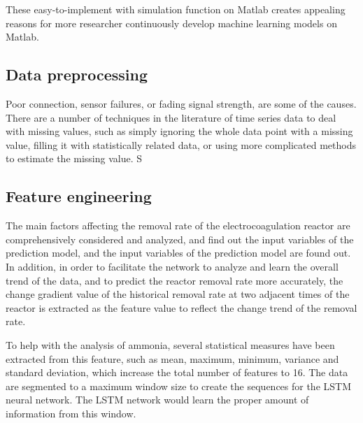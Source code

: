 These easy-to-implement with simulation function on Matlab creates appealing reasons for more researcher continuously develop machine learning models on Matlab. 




\subsection{Data preprocessing}
Poor connection, sensor failures, or fading signal strength, are some of the causes. There are a number of techniques in the literature of time series data to deal with missing values, such as simply ignoring the whole data point with a missing value, filling it with statistically related data, or using more complicated methods to estimate the missing value. S
\subsection{Feature engineering}
The main factors affecting the removal rate of the electrocoagulation reactor are comprehensively considered and analyzed, and find out the input variables of the prediction model, and the input variables of the prediction model are found out. In addition, in order to facilitate the network to analyze and learn the overall trend of the data, and to predict the reactor removal rate more accurately, the change gradient value of the historical removal rate at two adjacent times of the reactor is extracted as the feature value to reflect the change trend of the removal rate. \citep{zaghloulDevelopmentEnsembleMachine2021}

To help with the analysis of ammonia, several statistical measures have been extracted from this feature, such as mean, maximum, minimum, variance and standard deviation, which increase the total number of features to 16. The data are segmented to a maximum window size to create the sequences for the LSTM neural network. The LSTM network would learn the proper amount of information from this window. \citep{mamandipoorMonitoringDetectingFaults2020}